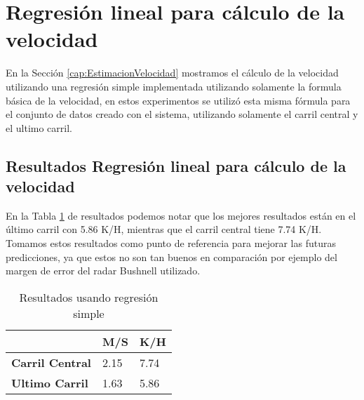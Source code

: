 \section{Regresión lineal para cálculo de la velocidad}

En la Sección \ref{cap:EstimacionVelocidad} mostramos el cálculo de la velocidad utilizando una regresión simple implementada utilizando solamente la formula básica de la velocidad, en estos experimentos se utilizó esta misma fórmula para el conjunto de datos creado con el sistema, utilizando solamente el carril central y el ultimo carril.

\subsection{Resultados Regresión lineal para cálculo de la velocidad}

En la Tabla \ref{tab:resultadosRLS} de resultados podemos notar que los mejores resultados están en el último carril con 5.86 K/H, mientras que el carril central tiene 7.74 K/H. Tomamos estos resultados como punto de referencia para mejorar las futuras predicciones, ya que estos no son tan buenos en comparación por ejemplo del margen de error del radar Bushnell utilizado.

\begin{table}[H]
    \centering
    \caption{Resultados usando regresión simple}
    \label{tab:resultadosRLS}
    \begin{tabular}{|l|l|l|}
    \hline
    \textbf{} & \textbf{M/S} & \textbf{K/H} \\ \hline
    \textbf{Carril Central} & 2.15 & 7.74 \\ \hline
    \textbf{Ultimo Carril}  & 1.63 & 5.86 \\ \hline
    \end{tabular}
\end{table}

